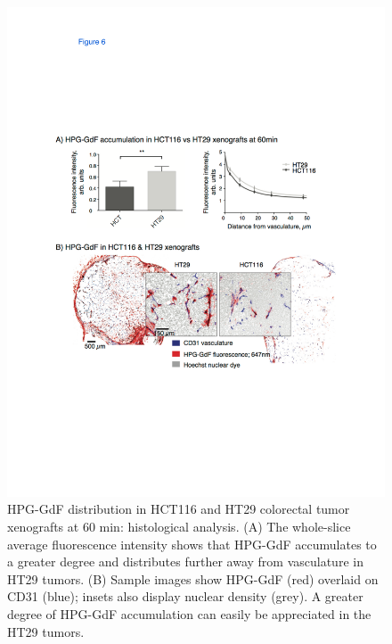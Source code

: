 \begin{figure}[htbp]   
 \begin{center}  
 \includegraphics[width=\textwidth]{hpg/hpg-paper1-images/hpg_fig6-accumulation.pdf}
 \caption{HPG-GdF distribution in HCT116 and HT29 colorectal tumor xenografts at 60 min: histological analysis. 
 (A) The whole-slice average fluorescence intensity shows that HPG-GdF accumulates to a greater degree and distributes further away from vasculature in HT29 tumors. 
 (B) Sample images show HPG-GdF (red) overlaid on CD31 (blue); insets also display nuclear density (grey). 
 A greater degree of HPG-GdF accumulation can easily be appreciated in the HT29 tumors.}  
 \label{hpgpaper1:fig6}  
 \end{center}
\end{figure}

